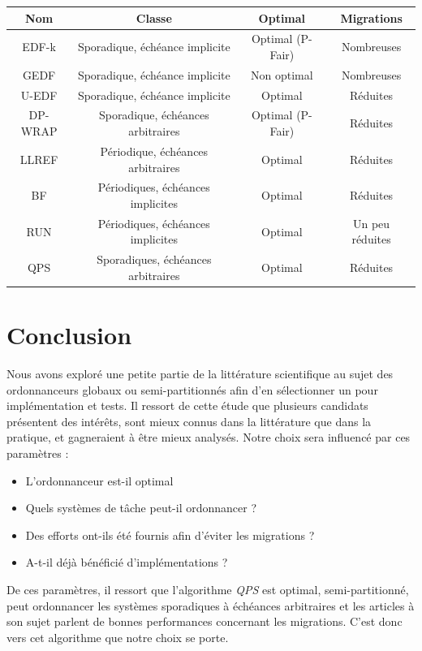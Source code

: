 \documentclass[11pt,a4paper,oneside]{report}
\begin{document}
	\begin{tabular}{|c|c|c|c|}
		\hline
		\textbf{Nom} & \textbf{Classe} &  \textbf{Optimal} & \textbf{Migrations}\\
		\hline
		\hline
		EDF-k & Sporadique, échéance implicite & Optimal (P-Fair) & Nombreuses \\
		\hline
		GEDF & Sporadique, échéance implicite & Non optimal & Nombreuses \\
		\hline    
		U-EDF & Sporadique, échéance implicite  & Optimal & Réduites\\
		\hline
		DP-WRAP & Sporadique, échéances arbitraires & Optimal (P-Fair)& Réduites\\
		\hline
		LLREF & Périodique, échéances arbitraires & Optimal & Réduites \\
		\hline
		BF & Périodiques, échéances implicites & Optimal & Réduites \\
		\hline
		RUN & Périodiques, échéances implicites & Optimal & Un peu réduites\\
		\hline
		QPS & Sporadiques, échéances arbitraires & Optimal & Réduites\\
		\hline
		
	\end{tabular}
	\bigskip
	
	\section{Conclusion}
	Nous avons exploré une petite partie de la littérature scientifique au sujet des ordonnanceurs 
	globaux ou semi-partitionnés afin d'en sélectionner un pour implémentation et tests. 
	Il ressort de cette étude que plusieurs candidats présentent des intérêts, sont mieux 
	connus dans la littérature que dans la pratique, et gagneraient à être mieux analysés. 
	Notre choix sera influencé par ces paramètres : \medskip
	\begin{itemize}
		\item L'ordonnanceur est-il optimal
		\item Quels systèmes de tâche peut-il ordonnancer ?
		\item Des efforts ont-ils été fournis afin d'éviter les migrations ?
		\item A-t-il déjà bénéficié d'implémentations ?
	\end{itemize}
	De ces paramètres, il ressort que l'algorithme \textit{QPS} est optimal, semi-partitionné, 
	peut ordonnancer les systèmes sporadiques à échéances arbitraires et 
	les articles à son sujet parlent de bonnes performances concernant les migrations. \medskip
	C'est donc vers cet algorithme que notre choix se porte.
	
	
	
	
	
\end{document}

